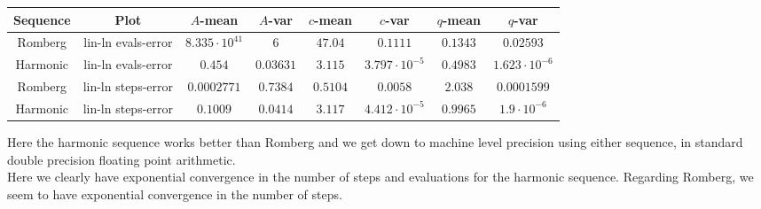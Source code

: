 \begin{table}[H]
    \centering
    \small
     \begin{tabular}{c|c||c|c|c|c|c|c}
Sequence & Plot & \(A\)-mean & \(A\)-var & \(c\)-mean & \(c\)-var & \(q\)-mean & \(q\)-var\\\hline
Romberg & lin-ln evals-error & \(8.335\cdot 10^{41}\) & \(6\) & \(47.04\) & \(0.1111\) & \(0.1343\) & \(0.02593\) \\
Harmonic & lin-ln evals-error & \(0.454\) & \(0.03631\) & \(3.115\) & \(3.797\cdot 10^{-5}\) & \(0.4983\) & \(1.623\cdot 10^{-6}\) \\
Romberg & lin-ln steps-error & \(0.0002771\) & \(0.7384\) & \(0.5104\) & \(0.0058\) & \(2.038\) & \(0.0001599\) \\
Harmonic & lin-ln steps-error & \(0.1009\) & \(0.0414\) & \(3.117\) & \(4.412\cdot 10^{-5}\) & \(0.9965\) & \(1.9\cdot 10^{-6}\) \\
    \end{tabular}
    \label{tab:my_label}
\end{table}

Here the harmonic sequence works better than Romberg and we get down to machine level precision using either sequence, in standard double precision floating point arithmetic.\\

Here we clearly have exponential convergence in the number of steps and evaluations for the harmonic sequence. Regarding Romberg, we seem to have exponential convergence in the number of steps.

